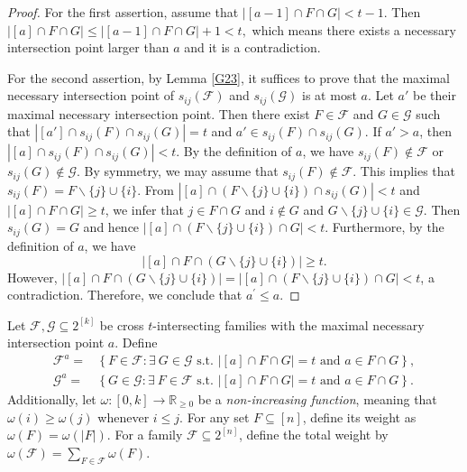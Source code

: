 \documentclass[11pt]{article}
\begin{document}
\begin{proof}
  For the first assertion, assume that
      $
       \left|[a-1] \cap F\cap G\right|< t-1.
      $
  Then 
      $
        \left|[a] \cap F\cap G\right|\le \left|[a-1] \cap F\cap G\right|+1<t,
      $
which means there exists a necessary intersection point larger than $a$ and it is a contradiction.

For the second assertion, by Lemma \ref{G23}, it suffices to prove that 
 the maximal necessary intersection point of $s_{ij}(\mathcal{F})$ and $ s_{ij}(\mathcal{G})$  is  at most $a$.
Let $a'$ be their  maximal necessary intersection point.
Then there exist $F \in \mathcal{F}$ and $ G  \in \mathcal{G} $ such that
$ \left|[a'] \cap s_{ij}(F)\cap s_{ij}(G)\right|= t $ and $a'\in s_{ij}(F)\cap s_{ij}(G)$. 
If $a' >a$, then $\left|[a] \cap s_{ij}(F)\cap s_{ij}(G)\right|<t$. 
By the definition of $a$,  we have $s_{ij}(F)\notin\mathcal{F}$ or 
 $s_{ij}(G)\notin\mathcal{G}$.
By symmetry, we may assume that $s_{ij}(F)\notin\mathcal{F}$.
This implies that $ s_{ij}(F)=F\backslash\{j\}\cup \{i\}$.
From $\left|[a] \cap (F\backslash\{j\}\cup \{i\})\cap s_{ij}(G)\right|<t$
and $\left|[a] \cap F\cap G\right|\geq t$, we infer that 
$j\in F\cap G$ and $i\notin G$ and $G\backslash\{j\}\cup \{i\}\in \mathcal{G}$. Then $s_{ij}(G)=G$ and hence $\left|[a] \cap (F\backslash\{j\}\cup \{i\})\cap G\right|<t$. Furthermore, by the definition of $a$, we have
$$\left|[a]\cap F\cap (G\backslash\{j\}\cup \{i\}) \right|\geq t.$$
However, 
$|[a]\cap F\cap (G\backslash\{j\}\cup \{i\})|= \left|[a] \cap (F\backslash\{j\}\cup \{i\})\cap G\right|< t$, a contradiction. Therefore, we conclude that $a^{\prime}\leq a$.
\end{proof}





 Let $\mathcal{F}, \mathcal{G} \subseteq2^{[k]}$ be cross $t$-intersecting families with the maximal necessary intersection point $a$. 
Define
\begin{align*}
\mathcal{F}^a=&\left\{F\in \mathcal{F}:  \exists~ G  \in \mathcal{G} \text{ s.t. } \left|[a] \cap F\cap G\right|=t \text { and } a \in F\cap G\right\},\\
\mathcal{G}^a=&\left\{G\in \mathcal{G}:  \exists~ F  \in \mathcal{F} \text{ s.t. } \left|[a] \cap F\cap G\right|=t \text { and } a \in F\cap G\right\}.
\end{align*}
Additionally, let $\omega:[0, k] \rightarrow \mathbb{R}_{\geq0}$ be a \textit{non-increasing function}, meaning that $\omega(i) \geq \omega(j)$ whenever $i \leq j$. For any set $F \subseteq [n]$, define its weight as $\omega(F) = \omega(|F|)$. For a family $\mathcal{F} \subseteq 2^{[n]}$, define the total weight by $\omega(\mathcal{F}) = \sum_{F \in \mathcal{F}} \omega(F)$.
 
\end{document}

